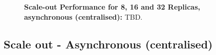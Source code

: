 \documentclass{rspublic}
\newcommand{\jhanote}[1]{ {\textcolor{red} { ***shantenu: #1 }}}
\newcommand{\alnote}[1]{ {\textcolor{blue} { ***andre: #1 }}}
\newcommand{\alnote}[1]{}
\newcommand{\jhanote}[1]{}
\begin{document}
%
\begin{figure}%
\centering
{}\qquad
\caption{\textbf{Scale-out Performance for 8, 16 and 32 Replicas, asynchronous (centralised):} 
  TBD.}
\label{fig:24machines}


\end{figure}

\subsection{Scale out - Asynchronous (centralised)}
\end{document}

